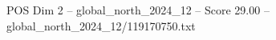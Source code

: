 \begin{textsample}{POS Dim 2 – global\_north\_2024\_12 – Score 29.00 – global\_north\_2024\_12/119170750.txt}
\end{textsample}
